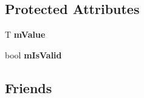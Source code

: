 \subsection*{Protected Attributes}
\begin{DoxyCompactItemize}
\item 
\hypertarget{classmozilla_1_1_checked_int_a8045f715191eab66c342cd1ffd148c36}{T {\bfseries m\-Value}}\label{classmozilla_1_1_checked_int_a8045f715191eab66c342cd1ffd148c36}

\item 
\hypertarget{classmozilla_1_1_checked_int_a5c7af97b3aaa092655f98be0dec2ac36}{bool {\bfseries m\-Is\-Valid}}\label{classmozilla_1_1_checked_int_a5c7af97b3aaa092655f98be0dec2ac36}

\end{DoxyCompactItemize}
\subsection*{Friends}

